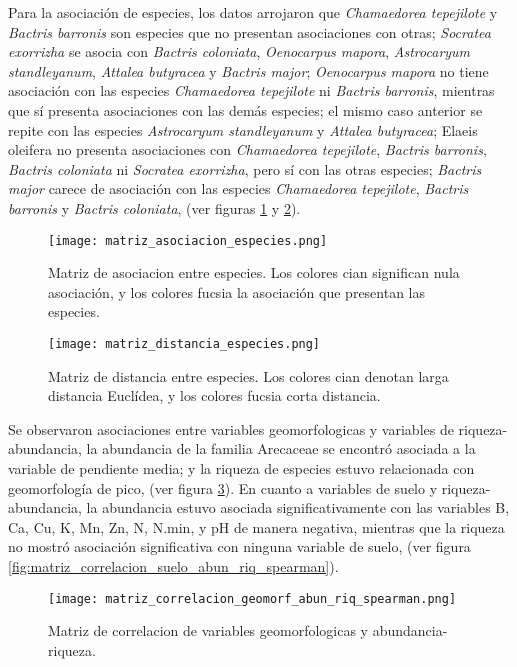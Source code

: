 \documentclass[11pt,]{article}
\begin{document}
Para la asociación de especies, los datos arrojaron que
\emph{Chamaedorea tepejilote} y \emph{Bactris barronis} son especies que
no presentan asociaciones con otras; \emph{Socratea exorrizha} se asocia
con \emph{Bactris coloniata}, \emph{Oenocarpus mapora},
\emph{Astrocaryum standleyanum}, \emph{Attalea butyracea} y
\emph{Bactris major}; \emph{Oenocarpus mapora} no tiene asociación con
las especies \emph{Chamaedorea tepejilote} ni \emph{Bactris barronis},
mientras que sí presenta asociaciones con las demás especies; el mismo
caso anterior se repite con las especies \emph{Astrocaryum standleyanum}
y \emph{Attalea butyracea}; Elaeis oleifera no presenta asociaciones con
\emph{Chamaedorea tepejilote}, \emph{Bactris barronis}, \emph{Bactris
coloniata} ni \emph{Socratea exorrizha}, pero sí con las otras especies;
\emph{Bactris major} carece de asociación con las especies
\emph{Chamaedorea tepejilote}, \emph{Bactris barronis} y \emph{Bactris
coloniata}, (ver figuras \ref{fig:matriz_asociacion_especies} y
\ref{fig:matriz_distancia_especies}).

\begin{figure}
\centering
\texttt{[image: matriz\_asociacion\_especies.png]}
\caption{Matriz de asociacion entre especies. Los colores cian
significan nula asociación, y los colores fucsia la asociación que
presentan las especies. \label{fig:matriz_asociacion_especies}}
\end{figure}

\begin{figure}
\centering
\texttt{[image: matriz\_distancia\_especies.png]}
\caption{Matriz de distancia entre especies. Los colores cian denotan
larga distancia Euclídea, y los colores fucsia corta distancia.
\label{fig:matriz_distancia_especies}}
\end{figure}

Se observaron asociaciones entre variables geomorfologicas y variables
de riqueza-abundancia, la abundancia de la familia Arecaceae se encontró
asociada a la variable de pendiente media; y la riqueza de especies
estuvo relacionada con geomorfología de pico, (ver figura
\ref{fig:matriz_correlacion_geomorf_abun_riq_spearman}). En cuanto a
variables de suelo y riqueza-abundancia, la abundancia estuvo asociada
significativamente con las variables B, Ca, Cu, K, Mn, Zn, N, N.min, y
pH de manera negativa, mientras que la riqueza no mostró asociación
significativa con ninguna variable de suelo, (ver figura
\ref{fig:matriz_correlacion_suelo_abun_riq_spearman}).

\begin{figure}
\centering
\texttt{[image: matriz\_correlacion\_geomorf\_abun\_riq\_spearman.png]}
\caption{Matriz de correlacion de variables geomorfologicas y
abundancia-riqueza.
\label{fig:matriz_correlacion_geomorf_abun_riq_spearman}}
\end{figure}
\end{document}
